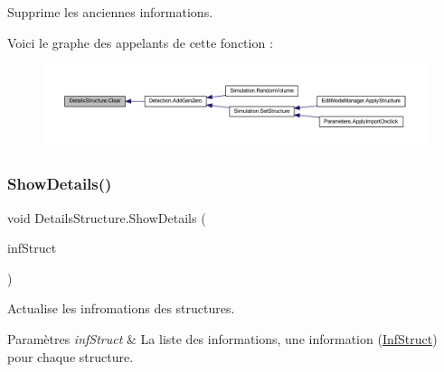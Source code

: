 Supprime les anciennes informations. 

Voici le graphe des appelants de cette fonction \+:
\nopagebreak
\begin{figure}[H]
\begin{center}
\leavevmode
\includegraphics[width=350pt]{class_details_structure_a4653aac26e25e56d4dd6b5f45ad9f4ef_icgraph}
\end{center}
\end{figure}
\mbox{\label{class_details_structure_a43f45ec1bc3888d7db09407d52964352}} 
\subsubsection{\texorpdfstring{Show\+Details()}{ShowDetails()}}
{\footnotesize\ttfamily void Details\+Structure.\+Show\+Details (\begin{DoxyParamCaption}\item[{List$<$ \mbox{\hyperlink{class_inf_struct}{Inf\+Struct}} $>$}]{inf\+Struct }\end{DoxyParamCaption})\hspace{0.3cm}{\ttfamily [inline]}}



Actualise les infromations des structures. 


\begin{DoxyParams}{Paramètres}
{\em inf\+Struct} & La liste des informations, une information (\mbox{\hyperlink{class_inf_struct}{Inf\+Struct}}) pour chaque structure.\\
\hline
\end{DoxyParams}
